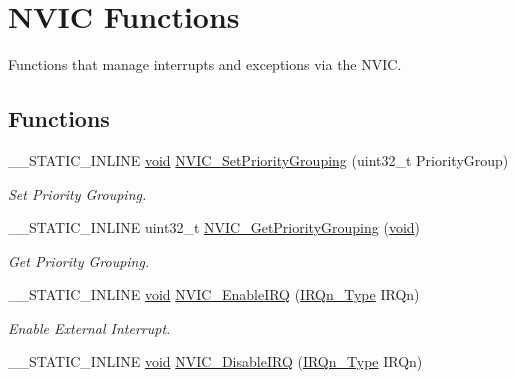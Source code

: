 \hypertarget{group__CMSIS__Core__NVICFunctions}{\section{N\-V\-I\-C Functions}
\label{group__CMSIS__Core__NVICFunctions}
}


Functions that manage interrupts and exceptions via the N\-V\-I\-C.  


\subsection*{Functions}
\begin{DoxyCompactItemize}
\item 
\-\_\-\-\_\-\-S\-T\-A\-T\-I\-C\-\_\-\-I\-N\-L\-I\-N\-E \hyperlink{Paradigm_2Tern__EE_2small_2portmacro_8h_a14d32f8130d3c0b212cfc751730b5b49}{void} \hyperlink{group__CMSIS__Core__NVICFunctions_ga77cfbb35a9d8027e392034321bed6904}{N\-V\-I\-C\-\_\-\-Set\-Priority\-Grouping} (uint32\-\_\-t Priority\-Group)
\begin{DoxyCompactList}\small\item\em Set Priority Grouping. \end{DoxyCompactList}\item 
\-\_\-\-\_\-\-S\-T\-A\-T\-I\-C\-\_\-\-I\-N\-L\-I\-N\-E uint32\-\_\-t \hyperlink{group__CMSIS__Core__NVICFunctions_ga394f7ce2ca826c0da26284d17ac6524d}{N\-V\-I\-C\-\_\-\-Get\-Priority\-Grouping} (\hyperlink{Paradigm_2Tern__EE_2small_2portmacro_8h_a14d32f8130d3c0b212cfc751730b5b49}{void})
\begin{DoxyCompactList}\small\item\em Get Priority Grouping. \end{DoxyCompactList}\item 
\-\_\-\-\_\-\-S\-T\-A\-T\-I\-C\-\_\-\-I\-N\-L\-I\-N\-E \hyperlink{Paradigm_2Tern__EE_2small_2portmacro_8h_a14d32f8130d3c0b212cfc751730b5b49}{void} \hyperlink{group__CMSIS__Core__NVICFunctions_ga3349f2e3580d7ce22d6530b7294e5921}{N\-V\-I\-C\-\_\-\-Enable\-I\-R\-Q} (\hyperlink{group__CMSIS__175X__6X__IRQ_gaaaeafe7bd8401a46d55e8431b6326116}{I\-R\-Qn\-\_\-\-Type} I\-R\-Qn)
\begin{DoxyCompactList}\small\item\em Enable External Interrupt. \end{DoxyCompactList}\item 
\-\_\-\-\_\-\-S\-T\-A\-T\-I\-C\-\_\-\-I\-N\-L\-I\-N\-E \hyperlink{Paradigm_2Tern__EE_2small_2portmacro_8h_a14d32f8130d3c0b212cfc751730b5b49}{void} \hyperlink{group__CMSIS__Core__NVICFunctions_ga260fba04ac8346855c57f091d4ee1e71}{N\-V\-I\-C\-\_\-\-Disable\-I\-R\-Q} (\hyperlink{group__CMSIS__175X__6X__IRQ_gaaaeafe7bd8401a46d55e8431b6326116}{I\-R\-Qn\-\_\-\-Type} I\-R\-Qn)

\end{DoxyCompactItemize}
